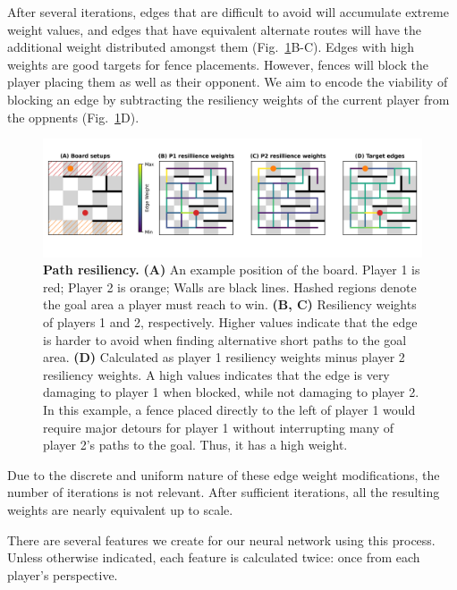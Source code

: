 \documentclass[10pt]{article}
\begin{document}
After several iterations, edges that are difficult to avoid will accumulate extreme weight values, and edges that have equivalent alternate routes will have the additional weight distributed amongst them (Fig.~\ref{fig:resiliency}B-C). Edges with high weights are good targets for fence placements. However, fences will block the player placing them as well as their opponent. We aim to encode the viability of blocking an edge by subtracting the resiliency weights of the current player from the oppnents (Fig.~\ref{fig:resiliency}D).

\begin{figure}[H]
    \centering
    \includegraphics[width=\linewidth]{path_figure.png}
    \caption{\textbf{Path resiliency.} \textbf{(A)} An example position of the board. Player 1 is red; Player 2 is orange; Walls are black lines. Hashed regions denote the goal area a player must reach to win. \textbf{(B, C)} Resiliency weights of players 1 and 2, respectively. Higher values indicate that the edge is harder to avoid when finding alternative short paths to the goal area. \textbf{(D)} Calculated as player 1 resiliency weights minus player 2 resiliency weights. A high values indicates that the edge is very damaging to player 1 when blocked, while not damaging to player 2. In this example, a fence placed directly to the left of player 1 would require major detours for player 1 without interrupting many of player 2's paths to the goal. Thus, it has a high weight.}
    \label{fig:resiliency}
\end{figure}

Due to the discrete and uniform nature of these edge weight modifications, the number of iterations is not relevant. After sufficient iterations, all the resulting weights are nearly equivalent up to scale.

There are several features we create for our neural network using this process. Unless otherwise indicated, each feature is calculated twice: once from each player's perspective.
\end{document}
